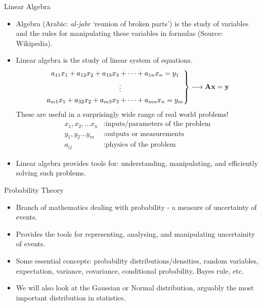\documentclass[aspectratio=169]{beamer}
\let\olditem\item
\renewcommand{\item}{\setlength{\itemsep}{\fill}\olditem}
\def\mf{\ensuremath\mathbf}
\begin{document}
\begin{frame}[t]{Linear Algebra}
  \begin{itemize}
    \item Algebra (Arabic: \textit{al-jabr} `reunion of broken parts') is the study of variables and the rules for manipulating these variables in formulas (Source: Wikipedia).
    
    \item Linear algebra is the study of linear system of equations.
    \[
      \left. \begin{aligned}
        a_{11} x_1 + a_{12} x_2 + a_{13} x_3 &+ \cdots + a_{1n} x_n = y_1\\
        &\vdots \\ 
        a_{m1} x_1 + a_{32} x_2 + a_{m3} x_3 &+ \cdots + a_{mn} x_n = y_m
      \end{aligned} \right\} \longrightarrow \mf{A}\mf{x} = \mf{y}
    \]
    These are useful in a surprisingly wide range of real world problems!
    \[ 
      \begin{split}
        x_1, x_2, \ldots x_n &: \text{inputs/parameters of the problem}\\
        y_1, y_2 \ldots y_m &: \text{outputs or measurements}\\
        a_{ij} &: \text{physics of the problem}
      \end{split}
    \]
    \item Linear algebra provides tools for: understanding, manipulating, and efficiently solving such problems.
  \end{itemize}
\end{frame}


\begin{frame}{Probability Theory}
  \begin{itemize}
    \item Branch of mathematics dealing with probability - a measure of uncertainty of events.
    
    \item Provides the tools for representing, analysing, and manipulating uncertainity of events.
    
    \item Some essential concepts: probability distributions/densities, random variables, expectation, variance, covariance, conditional probability, Bayes rule, etc.
    
    \item We will also look at the Gaussian or Normal distribution, arguably the most important distribution in statistics.
  \end{itemize}
\end{frame}
\end{document}
